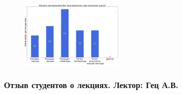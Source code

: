 		\begin{figure}[H]
			\centering
			\includegraphics[width = 0.45\textwidth]{images/3 course/Теория поля/materials.png}
		\end{figure}

	\subsubsection{Отзыв студентов о лекциях. Лектор: Гец А.В.}

